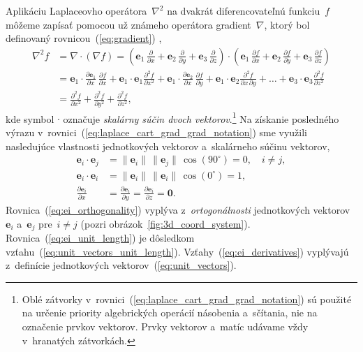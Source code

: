 \documentclass[a4paper, 12pt]{book}
\let\vec\mathbf
\begin{document}
Aplikáciu Laplaceovho operátora~$\nabla^2$ na dvakrát diferencovateľnú 
funkciu~$f$ môžeme zapísať pomocou už známeho operátora gradient~$\nabla$, 
ktorý bol definovaný rovnicou~(\ref{eq:gradient}) 
\parencite{SansoGeoidDetermination},
%
\begin{equation}
\label{eq:laplace_cart_grad_grad_notation}
\begin{split}
\nabla^2 f &= \nabla \cdot \left( \nabla f \right) = \left( \vec e_1 \, 
\frac{\partial}{\partial x} + \vec e_2 \, \frac{\partial}{\partial y} + \vec 
e_3 \, \frac{\partial}{\partial z} \right) \cdot \left( \vec e_1 \, 
\frac{\partial f}{\partial x} + \vec e_2 \, \frac{\partial f}{\partial y} 
+ \vec e_3 \, \frac{\partial f}{\partial z} \right)\\
%
&= \vec e_1 \cdot \frac{\partial \vec e_1}{\partial x} \, \frac{\partial 
f}{\partial x} + \vec e_1 \cdot \vec e_1 \frac{\partial^2 f}{\partial x^2} 
+ \vec e_1 \cdot \frac{\partial \vec e_2}{\partial x} \, \frac{\partial 
f}{\partial y} + \vec e_1 \cdot \vec e_2 \frac{\partial^2 f}{\partial x \, 
\partial y} + \dots + \vec e_3 \cdot \vec e_3 \frac{\partial^2 f}{\partial 
z^2}\\
%
&=\frac{\partial^2 f}{\partial x^2} + \frac{\partial^2 f}{\partial y^2} 
+ \frac{\partial^2 f}{\partial z^2}{,}
\end{split}
\end{equation}
%
kde symbol $\cdot$ označuje \emph{skalárny súčin dvoch vektorov}.\footnote{Oblé 
zátvorky v~rovnici~(\ref{eq:laplace_cart_grad_grad_notation}) sú použité na 
určenie priority algebrických operácií násobenia a~sčítania, nie na označenie 
prvkov vektorov.  Prvky vektorov a~matíc udávame vždy v~hranatých zátvorkách.} 
Na získanie posledného výrazu 
v~rovnici~(\ref{eq:laplace_cart_grad_grad_notation}) sme využili nasledujúce 
vlastnosti jednotkových vektorov a~skalárneho súčinu vektorov,
%
\begin{align}
\label{eq:ei_orthogonality}
\vec e_i \cdot \vec e_j &= \| \vec e_i \| \, \| \vec e_j \| \, \cos(90^\circ) 
= 0{,} \quad i \neq j{,}\\
%
\label{eq:ei_unit_length}
\vec e_i \cdot \vec e_i &= \| \vec e_i \| \, \| \vec e_i \| \, \cos(0^\circ) 
= 1{,}\\
%
\label{eq:ei_derivatives}
\frac{\partial \vec e_i}{\partial x} &= \frac{\partial \vec e_i}{\partial y} 
= \frac{\partial \vec e_i}{\partial z} = \vec 0{.}
\end{align}
%
Rovnica~(\ref{eq:ei_orthogonality}) vyplýva z~\emph{ortogonálnosti} 
jednotkových vektorov~$\vec e_i$ a~$\vec e_j$ pre~$i \neq j$ (pozri 
obrázok~\ref{fig:3d_coord_system}).  Rovnica~(\ref{eq:ei_unit_length}) je 
dôsledkom vzťahu~(\ref{eq:unit_vectors_unit_length}).  
Vzťahy~(\ref{eq:ei_derivatives}) vyplývajú z~definície jednotkových 
vektorov~(\ref{eq:unit_vectors}).
\end{document}
